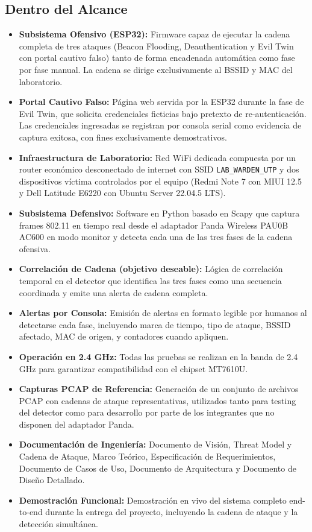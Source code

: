 \documentclass[11pt,a4paper]{article}
\begin{document}
\subsection{Dentro del Alcance}
\begin{itemize}
  \item \textbf{Subsistema Ofensivo (ESP32):} Firmware capaz de ejecutar la
    cadena completa de tres ataques (Beacon Flooding, Deauthentication y Evil
    Twin con portal cautivo falso) tanto de forma encadenada automática como
    fase por fase manual. La cadena se dirige exclusivamente al BSSID y MAC
    del laboratorio.
  \item \textbf{Portal Cautivo Falso:} Página web servida por la ESP32 durante
    la fase de Evil Twin, que solicita credenciales ficticias bajo pretexto
    de re-autenticación. Las credenciales ingresadas se registran por consola
    serial como evidencia de captura exitosa, con fines exclusivamente
    demostrativos.
  \item \textbf{Infraestructura de Laboratorio:} Red WiFi dedicada compuesta
    por un router económico desconectado de internet con SSID
    \texttt{LAB\_WARDEN\_UTP} y dos dispositivos víctima controlados por el
    equipo (Redmi Note 7 con MIUI 12.5 y Dell Latitude E6220 con Ubuntu Server
    22.04.5 LTS).
  \item \textbf{Subsistema Defensivo:} Software en Python basado en Scapy que
    captura frames 802.11 en tiempo real desde el adaptador Panda Wireless
    PAU0B AC600 en modo monitor y detecta cada una de las tres fases de la
    cadena ofensiva.
  \item \textbf{Correlación de Cadena (objetivo deseable):} Lógica de
    correlación temporal en el detector que identifica las tres fases como
    una secuencia coordinada y emite una alerta de cadena completa.
  \item \textbf{Alertas por Consola:} Emisión de alertas en formato legible
    por humanos al detectarse cada fase, incluyendo marca de tiempo, tipo de
    ataque, BSSID afectado, MAC de origen, y contadores cuando apliquen.
  \item \textbf{Operación en 2.4 GHz:} Todas las pruebas se realizan en la
    banda de 2.4 GHz para garantizar compatibilidad con el chipset MT7610U.
  \item \textbf{Capturas PCAP de Referencia:} Generación de un conjunto de
    archivos PCAP con cadenas de ataque representativas, utilizados tanto
    para testing del detector como para desarrollo por parte de los
    integrantes que no disponen del adaptador Panda.
  \item \textbf{Documentación de Ingeniería:} Documento de Visión, Threat
    Model y Cadena de Ataque, Marco Teórico, Especificación de Requerimientos,
    Documento de Casos de Uso, Documento de Arquitectura y Documento de
    Diseño Detallado.
  \item \textbf{Demostración Funcional:} Demostración en vivo del sistema
    completo end-to-end durante la entrega del proyecto, incluyendo la
    cadena de ataque y la detección simultánea.
\end{itemize}
\end{document}

